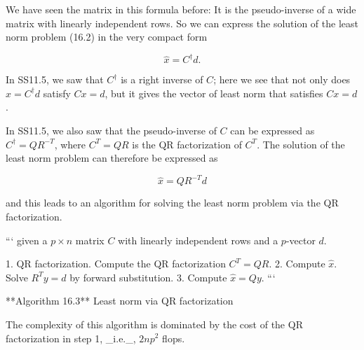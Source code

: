We have seen the matrix in this formula before: It is the pseudo-inverse of a wide matrix with linearly independent rows. So we can express the solution of the least norm problem (16.2) in the very compact form

\[\hat{x}=C^{\dagger}d.\]

In SS11.5, we saw that \(C^{\dagger}\) is a right inverse of \(C\); here we see that not only does \(\hat{x}=C^{\dagger}d\) satisfy \(Cx=d\), but it gives the vector of least norm that satisfies \(Cx=d\).

In SS11.5, we also saw that the pseudo-inverse of \(C\) can be expressed as \(C^{\dagger}=QR^{-T}\), where \(C^{T}=QR\) is the QR factorization of \(C^{T}\). The solution of the least norm problem can therefore be expressed as

\[\hat{x}=QR^{-T}d\]

and this leads to an algorithm for solving the least norm problem via the QR factorization.

``` given a \(p\times n\) matrix \(C\) with linearly independent rows and a \(p\)-vector \(d\).

1. QR factorization. Compute the QR factorization \(C^{T}=QR\).
2. Compute \(\hat{x}\). Solve \(R^{T}y=d\) by forward substitution.
3. Compute \(\hat{x}=Qy\). ```

**Algorithm 16.3** Least norm via QR factorization

The complexity of this algorithm is dominated by the cost of the QR factorization in step 1, _i.e._, \(2np^{2}\) flops.

 